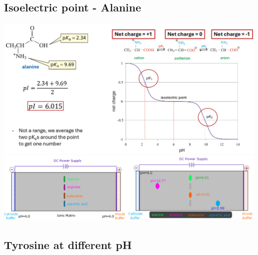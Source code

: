 \documentclass[10pt]{article}
\begin{document}
\subsection*{Isoelectric point - Alanine}
\begin{center}
    \includegraphics[width=\textwidth]{L2_2.png}
    \includegraphics[width=\textwidth]{L2_3.png}
\end{center}
\subsection*{Tyrosine at different pH}
\end{document}
